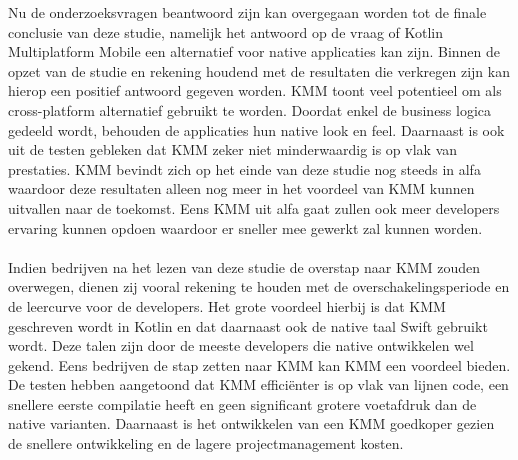 Nu de onderzoeksvragen beantwoord zijn kan overgegaan worden tot de finale conclusie van deze studie, namelijk het antwoord op de vraag of Kotlin Multiplatform Mobile een alternatief voor native applicaties kan zijn. Binnen de opzet van de studie en rekening houdend met de resultaten die verkregen zijn kan hierop een positief antwoord gegeven worden. KMM toont veel potentieel om als cross-platform alternatief gebruikt te worden. Doordat enkel de business logica gedeeld wordt, behouden de applicaties hun native look en feel. Daarnaast is ook uit de testen gebleken dat KMM zeker niet minderwaardig is op vlak van prestaties. KMM bevindt zich op het einde van deze studie nog steeds in alfa waardoor deze resultaten alleen nog meer in het voordeel van KMM kunnen uitvallen naar de toekomst. Eens KMM uit alfa gaat zullen ook meer developers ervaring kunnen opdoen waardoor er sneller mee gewerkt zal kunnen worden.
\\ \\
Indien bedrijven na het lezen van deze studie de overstap naar KMM zouden overwegen, dienen zij vooral rekening te houden met de overschakelingsperiode en de leercurve voor de developers. Het grote voordeel hierbij is dat KMM geschreven wordt in Kotlin en dat daarnaast ook de native taal Swift gebruikt wordt. Deze talen zijn door de meeste developers die native ontwikkelen wel gekend. Eens bedrijven de stap zetten naar KMM kan KMM een voordeel bieden. De testen hebben aangetoond dat KMM efficiënter is op vlak van lijnen code, een snellere eerste compilatie heeft en geen significant grotere voetafdruk dan de native varianten. Daarnaast is het ontwikkelen van een KMM goedkoper gezien de snellere ontwikkeling en de lagere projectmanagement kosten.


    

